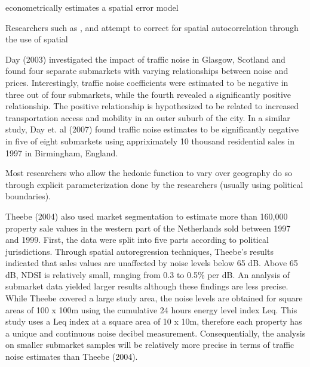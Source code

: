 \documentclass{article}\usepackage{graphicx, color}
\begin{document}
\citet{Theebe2004} econometrically estimates a spatial error model

Researchers such as , and \citet{Andersson2010} attempt to correct for spatial autocorrelation through the use of spatial


Day (2003) investigated the impact of traffic noise in Glasgow, Scotland and found four separate submarkets with varying relationships between noise and prices. Interestingly, traffic noise coefficients were estimated to be negative in three out of four submarkets, while the fourth revealed a significantly positive relationship. The positive relationship is hypothesized to be related to increased transportation access and mobility in an outer suburb of the city. In a similar study, Day et. al (2007) found traffic noise estimates to be significantly negative in five of eight submarkets using appriximately 10 thousand residential sales in 1997 in Birmingham, England.  

Most researchers who allow the hedonic function to vary over geography do so through explicit parameterization done by the researchers (usually using political boundaries).

Theebe (2004) also used market segmentation to estimate more than 160,000 property sale values in the western part of the Netherlands sold between 1997 and 1999.  First, the data were split into five parts according to political jurisdictions. Through spatial autoregression techniques, Theebe’s results indicated that sales values are unaffected by noise levels below 65 dB. Above 65 dB, NDSI is relatively small, ranging from 0.3 to 0.5\% per dB. An analysis of submarket data yielded larger results although these findings are less precise. While Theebe covered a large study area, the noise levels are obtained for square areas of 100 x 100m using the cumulative 24 hours energy level index Leq. This study uses a Leq index at a square area of 10 x 10m, therefore each property has a unique and continuous noise decibel measurement. Consequentially, the analysis on smaller submarket samples will be relatively more precise in terms of traffic noise estimates than Theebe (2004).
\end{document}
